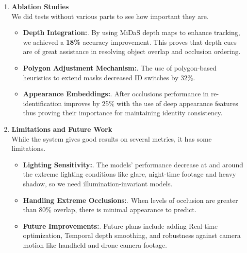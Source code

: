 \documentclass[12pt,a4paper]{report}
\theoremstyle{definition}
\theoremstyle{remark}
\begin{document}
\begin{enumerate}
\begin{enumerate}
\item \textbf{Occlusion Handling}.
\begin{itemize}
\item Occlusion detection was 82 percent accurate in the identification of an occlusion event.
\item Recall hit 75 percent or the system was able to recover most occluded objects.
\item The average positional prediction error during occlusions is \textbf{12 pixels} showing that it can reason about occlusion in the short term.
\end{itemize}

\end{enumerate}

    \item \textbf{Ablation Studies}\\
    We did tests without various parts to see how important they are.

\begin{itemize}
\item \textbf{Depth Integration:}.
By using MiDaS depth maps to enhance tracking, we achieved a \textbf{18\%} accuracy improvement. This proves that depth cues are of great assistance in resolving object overlap and occlusion ordering.

\item \textbf{Polygon Adjustment Mechanism:}.
The use of polygon-based heuristics to extend masks decreased ID switches by 32\%.

\item \textbf{Appearance Embeddings:}.
After occlusions performance in re-identification improves by 25\% with the use of deep appearance features thus proving their importance for maintaining identity consistency.
\end{itemize}

    \item \textbf{Limitations and Future Work}\\
    While the system gives good results on several metrics, it has some limitations.

\begin{itemize}
\item \textbf{Lighting Sensitivity:}.
The models’ performance decrease at and around the extreme lighting conditions like glare, night-time footage and heavy shadow, so we need illumination-invariant  models. 

\item \textbf{Handling Extreme Occlusions:}.
When levels of occlusion are greater than 80\% overlap, there is minimal appearance to predict.

\item \textbf{Future Improvements:}.
Future plans include adding Real-time optimization, Temporal depth smoothing, and robustness against camera motion like handheld and drone camera footage.
\end{itemize}

\end{enumerate}
\end{document}

